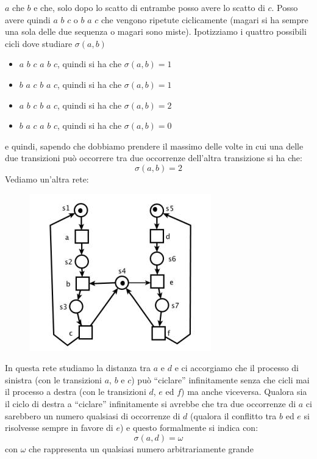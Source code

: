 \documentclass[a4paper,12pt, oneside]{book}
\begin{document}
\begin{esempio}
  $a$ che $b$ e che, solo dopo lo scatto di entrambe posso avere lo scatto di
  $c$. Posso avere quindi $a\,\,b\,\,c$ o $b\,\,a\,\,c$ che vengono ripetute
  ciclicamente (magari si ha sempre una sola delle due sequenza o magari sono
  miste). Ipotizziamo i quattro possibili cicli dove studiare $\sigma(a,b)$
  \begin{itemize}
    \item $a\,\,b\,\,c\,\,a\,\,b\,\,c$, quindi si ha che $\sigma(a,b) = 1$
    \item $b\,\,a\,\,c\,\,b\,\,a\,\,c$, quindi si ha che $\sigma(a,b) = 1$
    \item $a\,\,b\,\,c\,\,b\,\,a\,\,c$, quindi si ha che $\sigma(a,b) = 2$
    \item $b\,\,a\,\,c\,\,a\,\,b\,\,c$, quindi si ha che $\sigma(a,b) = 0$
  \end{itemize}
  e quindi, sapendo che dobbiamo prendere il massimo delle volte in cui una
  delle due transizioni può occorrere tra due occorrenze dell’altra transizione
  si ha che:
  \[\sigma(a,b) = 2\]
  \newpage
  Vediamo un'altra rete:
  \begin{figure}[H]
    \centering
    \includegraphics[scale = 0.6]{img/ds3.jpg}
  \end{figure}
  In questa rete studiamo la distanza tra $a$ e $d$ e ci accorgiamo che il
  processo di sinistra (con le transizioni $a$, $b$ e $c$) può ``ciclare''
  infinitamente senza che cicli mai il processo a destra (con le transizioni
  $d$, $e$ ed $f$) ma anche viceversa. Qualora sia il ciclo di destra a
  ``ciclare'' infinitamente si avrebbe che tra due occorrenze di $a$ ci
  sarebbero un numero qualsiasi di occorrenze di $d$ (qualora il conflitto tra
  $b$ ed $e$ si risolvesse sempre in favore di $e$) e questo formalmente si
  indica con:
  \[\sigma(a,d) = \omega\]
  con $\omega$ che rappresenta un qualsiasi numero arbitrariamente grande
\end{esempio}
\end{document}

